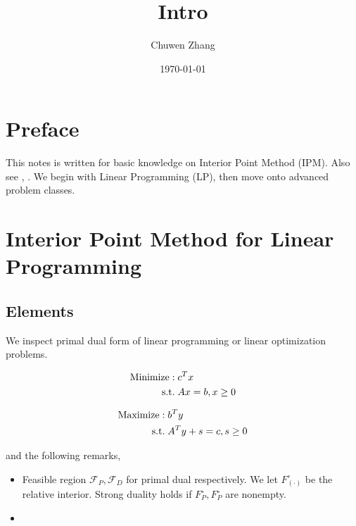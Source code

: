 \documentclass[main]{subfiles}
\title{Intro}
\author{Chuwen Zhang}
\date{\today}
\begin{document}
\maketitle
{
    \setcounter{tocdepth}{3}
    \tableofcontents
}

\section{Preface}

This notes is written for basic knowledge on Interior Point Method (IPM). Also see \cite{ye_interior_1997}, \cite{roos_interior_2005}.
We begin with Linear Programming (LP), then move onto advanced problem classes.

\section{Interior Point Method for Linear Programming}

\subsection{Elements}

We inspect primal dual form of linear programming or linear optimization problems.

\begin{equation}
    \begin{aligned}
        \mathrm{Minimize:\;} & c^T x         \\
        \mathrm{s.t.\;} & A x=b, x\ge 0
    \end{aligned}
\end{equation}

\begin{equation}
    \begin{aligned}
        \mathrm{Maximize:\;} & b^Ty                  \\
        \mathrm{s.t.\;} & A^{T} y+s=c, s \geq 0
    \end{aligned}
\end{equation}

and the following remarks,

\begin{itemize}
    \item Feasible region \(\mathscr F_P, \mathscr F_D\) for primal dual respectively.
          We let \(F^\circ_{(\cdot)}\) be the relative interior.
          Strong duality holds if \(F^\circ_{P}, F^\circ_{P}\) are nonempty.
    \item
\end{itemize}
\end{document}
